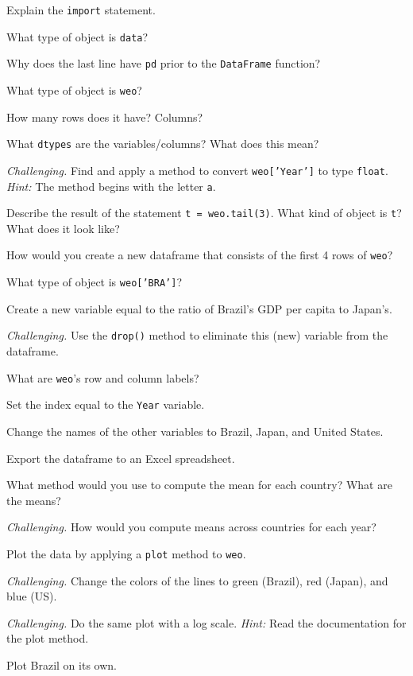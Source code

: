\documentclass[11pt]{exam}
\begin{document}
\begin{questions}
\begin{parts}
\item Explain the \texttt{import} statement.
\item What type of object is {\tt data}?
\item Why does the last line have {\tt pd} prior to the {\tt DataFrame} function?
\item What type of object is {\tt weo}?
\item How many rows does it have?  Columns?
\item What {\tt dtypes} are the variables/columns?  What does this mean?
\item {\it Challenging.\/}
Find and apply a method to convert {\tt weo['Year']} to type {\tt float}. 
{\it Hint:\/} The method begins with the letter {\tt a}. 
\item Describe the result of the statement \texttt{t = weo.tail(3)}.
What kind of object is \texttt{t}?  What does it look like?
\item How would you create a new dataframe that consists of the first 4 rows of \texttt{weo}?
\item What type of object is \texttt{weo['BRA']}?
\item Create a new variable equal to the ratio of Brazil's GDP per capita to Japan's.
\item {\it Challenging.\/}
Use the {\tt drop()} method to eliminate this (new) variable from the dataframe.
\item What are {\tt weo}'s row and column labels?
\item Set the index equal to the {\tt Year} variable.
\item Change the names of the other variables to Brazil, Japan, and United States.
\item Export the dataframe to an Excel spreadsheet.
\item What method would you use to compute the mean for each country?
What are the means?
\item {\it Challenging.\/}
How would you compute means across countries for each year?
\item Plot the data by applying a {\tt plot} method to {\tt weo}.
\item {\it Challenging.\/} Change the colors of the lines to green (Brazil), red (Japan),
and blue (US).
\item {\it Challenging.\/}
Do the same plot with a log scale.  
{\it Hint:\/} Read the documentation for the plot method.  
\item Plot Brazil on its own.
\end{parts}



\end{questions}
\end{document}
